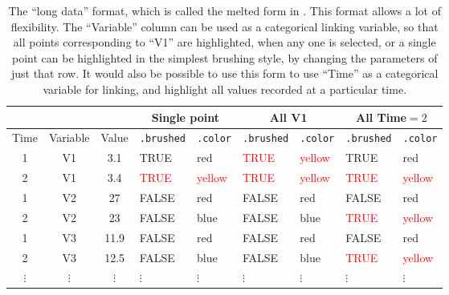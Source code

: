\documentclass[12pt]{article}
\providecommand{\tabularnewline}{\\}
\begin{document}
\begin{table}[H]%
\begin{center}
\begin{tabular}{|c|cc|ll||ll||ll|}
\hline
\multicolumn{1}{|c}{} & \multicolumn{2}{c|}{} & \multicolumn{2}{c||}{Single point}& \multicolumn{2}{c||}{All V1}& \multicolumn{2}{c|}{All Time$=2$}\tabularnewline
\hline
Time & Variable & Value & \texttt{.brushed} & \texttt{.color} & \texttt{.brushed} & \texttt{.color} & \texttt{.brushed} & \texttt{.color}\tabularnewline
\hline
1 & V1 & 3.1 & TRUE & red & \textcolor{red}{TRUE} & \textcolor{red}{yellow} & TRUE & red \tabularnewline
2 & V1 & 3.4 & \textcolor{red}{TRUE} & \textcolor{red}{yellow} & \textcolor{red}{TRUE} & \textcolor{red}{yellow} & \textcolor{red}{TRUE} & \textcolor{red}{yellow}\tabularnewline
1 & V2 & 27 & FALSE & red & FALSE & red & FALSE & red\tabularnewline
2 & V2 & 23 & FALSE & blue & FALSE & blue & \textcolor{red}{TRUE} & \textcolor{red}{yellow} \tabularnewline
1 & V3 & 11.9 & FALSE & red & FALSE & red & FALSE & red \tabularnewline
2 & V3 & 12.5 & FALSE & blue & FALSE & blue & \textcolor{red}{TRUE} & \textcolor{red}{yellow}\tabularnewline
$\vdots$ & $\vdots$ & $\vdots$ & $\vdots$ & $\vdots$ & $\vdots$ & $\vdots$ & $\vdots$ & $\vdots$ \tabularnewline
\hline
\end{tabular}
\end{center}
\caption{\label{tab:long-data}The ``long data'' format, which is called the melted form in \citet{reshape}. This format allows a lot of flexibility. The ``Variable'' column can be used as a categorical linking variable, so that all points corresponding to ``V1'' are highlighted, when any one is selected, or a single point can be highlighted in the simplest brushing style, by changing the parameters of just that row. It would also be possible to use this form to use ``Time'' as a categorical variable for linking, and highlight all values recorded at a particular time. }
\end{table}
\end{document}
